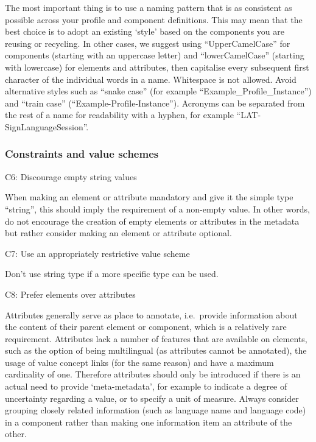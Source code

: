 The most important thing is to use a naming pattern that is as
consistent as possible across your profile and component definitions.
This may mean that the best choice is to adopt an existing `style' based
on the components you are reusing or recycling. In other cases, we
suggest using ``UpperCamelCase'' for components (starting with an
uppercase letter) and ``lowerCamelCase'' (starting with lowercase) for
elements and attributes, then capitalise every subsequent first
character of the individual words in a name. Whitespace is not allowed.
Avoid alternative styles such as ``snake case'' (for example
``Example\_Profile\_Instance'') and ``train case''
(``Example-Profile-Instance''). Acronyms can be separated from the rest
of a name for readability with a hyphen, for example
``LAT-SignLanguageSession''.

\hypertarget{constraints-and-value-schemes}{\subsubsection{Constraints
and value schemes}\label{constraints-and-value-schemes}}

C6: Discourage empty string values


When making an element or attribute mandatory and give it the simple
type ``string'', this should imply the requirement of a non-empty value.
In other words, do not encourage the creation of empty elements or
attributes in the metadata but rather consider making an element or
attribute optional.

C7: Use an appropriately restrictive value scheme


Don't use string type if a more specific type can be used.

C8: Prefer elements over attributes


Attributes generally serve as place to annotate, i.e.~provide
information about the content of their parent element or component,
which is a relatively rare requirement. Attributes lack a number of
features that are available on elements, such as the option of being
multilingual (as attributes cannot be annotated), the usage of value
concept links (for the same reason) and have a maximum cardinality of
one. Therefore attributes should only be introduced if there is an
actual need to provide `meta-metadata', for example to indicate a degree
of uncertainty regarding a value, or to specify a unit of measure.
Always consider grouping closely related information (such as language
name and language code) in a component rather than making one
information item an attribute of the other.

